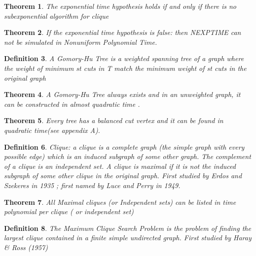 \documentclass[12pt]{article}
\newtheorem{thm}{Theorem}[section]
\newtheorem{mydef}[thm]{Definition}
\begin{document}
\begin{thm}\cite[Theorem 5.5]{CHEN2006} \label{cliquebound} The exponential time hypothesis holds if and only if there is no subexponential algorithm for clique \end{thm}

\begin{thm}\label{complexity} If the exponential time hypothesis is false: then NEXPTIME can not be simulated in Nonuniform Polynomial Time.\end{thm}

\begin{mydef}\label{GHt}\cite{kolmogorov2022} \cite{GomoryHu1961} A Gomory-Hu Tree is a weighted spanning tree of a graph where the weight of minimum st cuts in T match the minimum weight of st cuts in the original graph\end{mydef}

\begin{thm} \label{GH} A Gomory-Hu Tree always exists \cite{GomoryHu1961} and in an unweighted graph, it can be constructed in almost quadratic time \cite{Abbound2021}.\end{thm}

\begin{thm}\label{CT} Every tree has a balanced cut vertex\cite{Jordan1869} and it can be found in quadratic time(see appendix A).\end{thm}

\begin{mydef} Clique: a clique is a complete graph (the simple graph with every possible edge) which is an induced subgraph of some other graph. The complement of a clique is an independent set. A clique is maximal if it is not the induced subgraph of some other clique in the original graph. First studied by Erdos and Szekeres in 1935 \cite{ErdosANDszekeres1935}; first named by Luce and Perry in 1949.\cite{LuceANDPerry1949}\end{mydef}

\begin{thm}  \cite{TsukiyamaETAL1977} All Maximal cliques (or Independent sets) can be listed in time polynomial per clique ( or independent set)\end{thm} 

\begin{mydef} The Maximum Clique Search Problem is the problem of finding the largest clique contained in a finite simple undirected graph. First studied by Haray \& Ross (1957)\cite{HarayANDRoss1957} \end{mydef}
\end{document}
